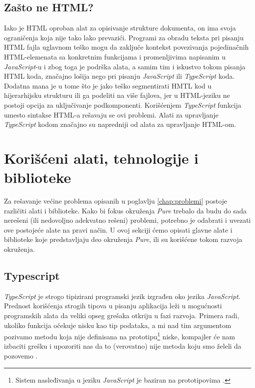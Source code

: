 \documentclass[12pt,oneside]{memoir}
\begin{document}
\subsection{Zašto ne HTML?} \label{subsec:zasto-ne-html}
Iako je HTML oproban alat za opisivanje strukture dokumenta, on ima svoja ograničenja koja nije tako lako prevazići.
Programi za obradu teksta pri pisanju HTML fajla uglavnom teško mogu da zaključe kontekst povezivanja
pojedinačnih HTML-elemenata sa konkretnim funkcijama i promenljivima napisanim u \emph{JavaScript}-u i zbog toga je podrška alata,
a samim tim i iskustvo tokom pisanja HTML koda, značajno lošija nego pri pisanju \emph{JavaScript} ili \emph{TypeScript} koda.
Dodatna mana je u tome što je jako teško segmentirati HMTL kod u hijerarhijsku strukturu ili ga podeliti na više fajlova,
jer u HTML-jeziku ne postoji opcija za uključivanje podkomponenti.
Korišćenjem \emph{TypeScript} funkcija umesto sintakse HTML-a rešavaju se ovi problemi.
Alati za upravljanje \emph{TypeScript} kodom značajno su napredniji od alata za upravljanje HTML-om.

\section{Korišćeni alati, tehnologije i biblioteke}
Za rešavanje većine problema opisanih u poglavlju \ref{chap:problemi} postoje različiti alati i biblioteke. 
Kako bi fokus okruženja \emph{Pure} trebalo da budu do sada nerešeni (ili nedovoljno adekvatno rešeni) problemi,
potrebno je odabrati i uvezati ove postojeće alate na pravi način. U ovoj sekciji ćemo opisati glavne
alate i biblioteke koje predstavljaju deo okruženja \emph{Pure}, ili su korišćene tokom razvoja okruženja.

\subsection{Typescript}
\emph{TypeScript} je strogo tipizirani programski jezik izgrađen oko jezika \emph{JavaScript}.
Prednost korišćenja strogih tipova u pisanju aplikacija leži u mogućnosti programskih alata
da veliki opseg grešaka otkriju u fazi razvoja. Primera radi, ukoliko funkcija očekuje nisku
kao tip podataka, a mi nad tim argumentom pozivamo metodu koja nije definisana na
prototipu\footnote{Sistem nasleđivanja u jeziku \emph{JavaScript}
je baziran na prototipovima \cite{PrototypeInheritance}.} niske,
kompajler će nam izbaciti grešku i upozoriti nas da to (verovatno) nije metoda koju smo želeli da pozovemo \cite{PrototypeInheritance}.
\end{document}
